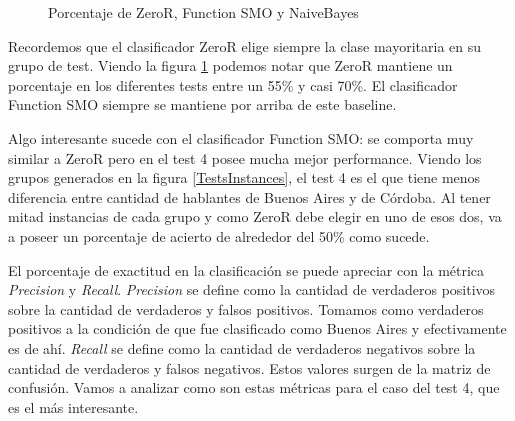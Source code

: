 \begin{figure}[H]
\centering
{}
\caption{Porcentaje de ZeroR, Function SMO y NaiveBayes}
\label{porcentajexClasificador}
\end{figure}

Recordemos que el clasificador ZeroR elige siempre la clase mayoritaria en su grupo de test. Viendo la figura \ref{porcentajexClasificador} podemos notar que ZeroR mantiene un porcentaje en los diferentes tests entre un 55\% y casi 70\%. El clasificador Function SMO siempre se mantiene por arriba de este baseline. 

Algo interesante sucede con el clasificador Function SMO: se comporta muy similar a ZeroR pero en el test 4 posee mucha mejor performance. Viendo los grupos generados en la figura \ref{TestsInstances}, el test 4 es el que tiene menos diferencia entre cantidad de hablantes de Buenos Aires y de Córdoba. Al tener mitad instancias de cada grupo y como ZeroR debe elegir en uno de esos dos, va a poseer un porcentaje de acierto de alrededor del 50\% como sucede.  

El porcentaje de exactitud en la clasificación se puede apreciar con la métrica \textit{Precision} y \textit{Recall}. \textit{Precision} se define como la cantidad de verdaderos positivos sobre la cantidad de verdaderos y falsos positivos. Tomamos como verdaderos positivos a la condición de que fue clasificado como Buenos Aires y efectivamente es de ahí. \textit{Recall} se define como la cantidad de verdaderos negativos sobre la cantidad de verdaderos y falsos negativos. Estos valores surgen de la matriz de confusión. Vamos a analizar como son estas métricas para el caso del test 4, que es el más interesante.

